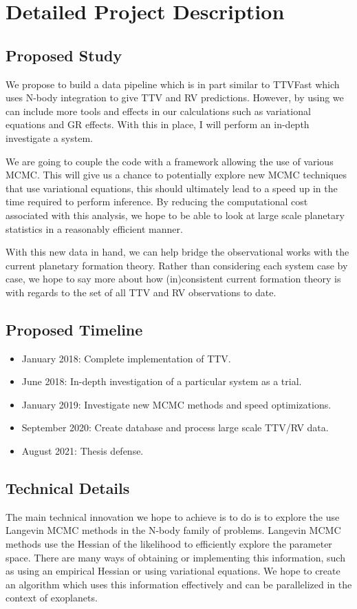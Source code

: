 \section{Detailed Project Description}
\subsection{Proposed Study}
We propose to build a data pipeline which is in part similar to TTVFast which uses N-body integration to give TTV and RV predictions. 
However, by using \reb we can include more tools and effects in our calculations such as variational equations and GR effects.
With this in place, I will perform an in-depth investigate a system.


We are going to couple the \reb code with a framework allowing the use of various MCMC.
This will give us a chance to potentially explore new MCMC techniques that use variational equations, this should ultimately lead to a speed up in the time required to perform inference.
By reducing the computational cost associated with this analysis, we hope to be able to look at large scale planetary statistics in a reasonably efficient manner.


With this new data in hand, we can help bridge the observational works with the current planetary formation theory.
Rather than considering each system case by case, we hope to say more about how (in)consistent current formation theory is with regards to the set of all TTV and RV observations to date.
\subsection{Proposed Timeline}
\begin{itemize}
	\item January 2018: Complete implementation of TTV.
	\item June 2018: In-depth investigation of a particular system as a trial.
	\item January 2019: Investigate new MCMC methods and speed optimizations.
	\item September 2020: Create database and process large scale TTV/RV data.
	\item August 2021: Thesis defense.
\end{itemize}

\subsection{Technical Details}
The main technical innovation we hope to achieve is to do is to explore the use Langevin MCMC methods in the N-body family of problems. 
Langevin MCMC methods use the Hessian of the likelihood to efficiently explore the parameter space. 
There are many ways of obtaining or implementing this information, such as using an empirical Hessian or using variational equations. 
We hope to create an algorithm which uses this information effectively and can be parallelized in the context of exoplanets.

